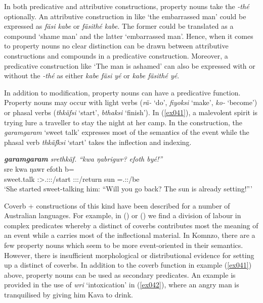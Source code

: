 In both predicative and attributive constructions, property nouns take the  \emph{-thé} optionally. An attributive construction in  like `the embarrassed man' could be expressed as \emph{fäsi kabe} or \emph{fäsithé kabe}. The former could be translated as a compound `shame man' and the latter `embarrassed man'. Hence, when it comes to property nouns no clear distinction can be drawn between attributive constructions and  compounds in a predicative construction. Moreover, a predicative construction like  `The man is ashamed' can also be expressed with or without the  \emph{-thé} as either \emph{kabe fäsi yé} or \emph{kabe fäsithé yé}.%

In addition to  modification, property nouns can have a predicative function. Property nouns may occur with light verbs (\emph{rä-} `do', \emph{fiyoksi} `make', \emph{ko-} `become') or phasal verbs (\emph{thkäfsi} `start', \emph{bthaksi} `finish'). In (\ref{ex041}), a malevolent spirit is trying lure a traveller to stay the night at her camp. In the construction, the  \emph{garamgaram} `sweet talk' expresses most of the semantics of the event while the phasal verb \emph{thkäfksi} `start' takes the inflection and indexing.

\begin{exe}
	\ex \emph{\textbf{garamgaram} srethkäf. ``kwa ŋabrigwr? efoth byé!''}\\
	 sre kwa ŋawr efoth b=\\
	sweet.talk \Stsg{}:\Sbj{}>\Tsg{}.\Masc{}:\Obj{}:\Irr{}:\Pfv{}/start \Fut{} \Stsg{}:\Sbj:\Nonpast:\Ipfv/return sun \Med{}=\Tsg{}.\Masc{}:\Nonpast:\Ipfv/be\\
	\trans `She started sweet-talking him: ``Will you go back? The sun is already setting!''' 
	\label{ex041}
\end{exe}

Coverb +  constructions of this kind have been described for a number of Australian languages. For example, in  (\citealt{SchultzeBerndt:2000wk}) or  (\citealt{Meakins:ul}) we find a division of labour in complex predicates whereby a distinct  of coverbs contributes most the meaning of an event while a  carries most of the inflectional material. In Komnzo, there are a few property nouns which seem to be more event-oriented in their semantics. However, there is insufficient morphological or distributional evidence for setting up a distinct  of coverbs. In addition to the coverb function in example (\ref{ex041}) above, property nouns can be used as secondary predicates. An example is provided in the use of \emph{wri} `intoxication' in (\ref{ex042}), where an angry man is tranquilised by giving him Kava to drink.

